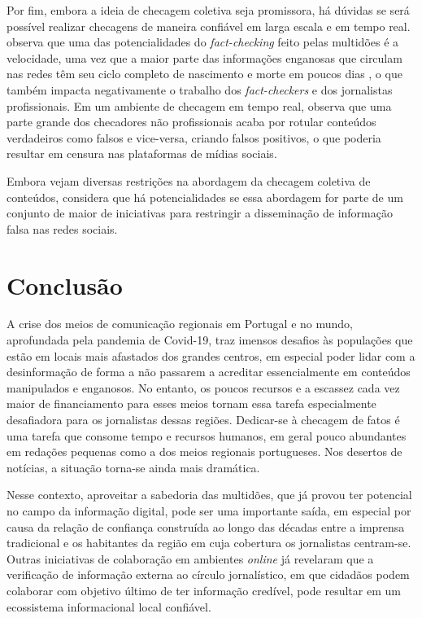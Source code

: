 \documentclass[portuguese]{textolivre}
\begin{document}
Por fim, embora a ideia de checagem coletiva seja promissora, há dúvidas se será possível realizar checagens de maneira confiável em larga escala e em tempo real. \textcite{godel_moderating_2021} observa que uma das potencialidades do \emph{fact-checking} feito pelas multidões é a velocidade, uma vez que a maior parte das informações enganosas que circulam nas redes têm seu ciclo completo de nascimento e morte em poucos dias \cite{vosoughi_spread_2018}, o que também impacta negativamente o trabalho dos \emph{fact-checkers} e dos jornalistas profissionais. Em um ambiente de checagem em tempo real, \textcite{godel_moderating_2021} observa que uma parte grande dos checadores não profissionais acaba por rotular conteúdos verdadeiros como falsos e vice-versa, criando falsos positivos, o que poderia resultar em censura nas plataformas de mídias sociais.

Embora vejam diversas restrições na abordagem da checagem coletiva de conteúdos, \textcite{godel_moderating_2021} considera que há potencialidades se essa abordagem for parte de um conjunto de maior de iniciativas para restringir a disseminação de informação falsa nas redes sociais.


\section{Conclusão}

A crise dos meios de comunicação regionais em Portugal e no mundo, aprofundada pela pandemia de Covid-19, traz imensos desafios às populações que estão em locais mais afastados dos grandes centros, em especial poder lidar com a desinformação de forma a não passarem a acreditar essencialmente em conteúdos manipulados e enganosos. No entanto, os poucos recursos e a escassez cada vez maior de financiamento para esses meios tornam essa tarefa especialmente desafiadora para os jornalistas dessas regiões. Dedicar-se à checagem de fatos é uma tarefa que consome tempo e recursos humanos, em geral pouco abundantes em redações pequenas como a dos meios regionais portugueses. Nos desertos de notícias, a situação torna-se ainda mais dramática.

Nesse contexto, aproveitar a sabedoria das multidões, que já provou ter potencial no campo da informação digital, pode ser uma importante saída, em especial por causa da relação de confiança construída ao longo das décadas entre a imprensa tradicional e os habitantes da região em cuja cobertura os jornalistas centram-se. Outras iniciativas de colaboração em ambientes \emph{online} já revelaram que a verificação de informação externa ao círculo jornalístico, em que cidadãos podem colaborar com objetivo último de ter informação credível, pode resultar em um ecossistema informacional local confiável.
\end{document}
